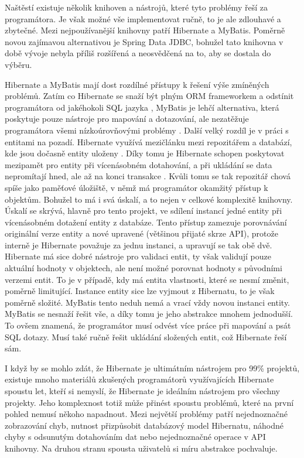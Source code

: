 		Naštěstí existuje několik knihoven a nástrojů, které tyto problémy řeší za programátora.
		Je však možné vše implementovat ručně, to je ale zdlouhavé a zbytečné.
		Mezi nejpoužívanější knihovny patří Hibernate a MyBatis.
		Poměrně novou zajímavou alternativou je Spring Data JDBC, bohužel tato knihovna v době vývoje nebyla příliš
		rozšířená a neosvědčená na to, aby se dostala do výběru.

		Hibernate a MyBatis mají dost rozdílné přístupy k řešení výše zmíněných problémů.
		Zatím co Hibernate se snaží být plným \ac{ORM} frameworkem a odstínit programátora od jakéhokoli
		\ac{SQL} jazyka \cite{hibernate_docs}, MyBatis je lehčí alternativa, která poskytuje pouze nástroje pro mapování a dotazování, ale
		nezatěžuje programátora všemi nízkoúrovňovými problémy \cite{mybatis_getting_started}.
		Další velký rozdíl je v práci s entitami na pozadí.
		Hibernate využívá mezičlánku mezi repozitářem a databází, kde jsou dočasně entity uloženy \cite{hibernate_docs}.
		Díky tomu je Hibernate schopen poskytovat mezipamět pro entity při vícenásobném dotahování, a při ukládání
		se data nepromítají hned, ale až na konci transakce \cite{hibernate_docs}.
		Kvůli tomu se tak repozitář chová spíše jako paměťové úložiště, v němž má programátor okamžitý přístup k objektům.
		Bohužel to má i svá úskalí, a to nejen v celkové komplexitě knihovny.
		Úskalí se skrývá, hlavně pro tento projekt, ve sdílení instancí jedné entity při vícenásobném
		dotažení entity z databáze.
		Tento přístup zamezuje porovnávání originální verze entity a nové upravené (většinou přijaté skrze \ac{API}),
		protože interně je Hibernate považuje za jednu instanci, a upravují se tak obě dvě.
		Hibernate má sice dobré nástroje pro validaci entit, ty však validují pouze aktuální hodnoty v objektech, ale
		není možné porovnat hodnoty s původními verzemi entit.
		To je v případě, kdy má entita vlastnosti, které se nesmí změnit, poměrně limitující.
		Instance entity sice lze vyjmout z Hibernatu, to je však poměrně složité.
		MyBatis tento neduh nemá a vrací vždy novou instanci entity.
		MyBatis se nesnaží řešit vše, a díky tomu je jeho abstrakce mnohem jednodušší.
		To ovšem znamená, že programátor musí odvést více práce při mapování a psát \ac{SQL} dotazy.
		Musí také ručně řešit ukládání složených entit, což Hibernate řeší sám.

		I když by se mohlo zdát, že Hibernate je ultimátním nástrojem pro 99\% projektů, existuje mnoho materiálů
		zkušených programátorů využívajících Hibernate spoustu let, kteří si nemyslí, že Hibernate je ideálním nástrojem
		pro všechny projekty.
		Jeho komplexnost totiž může přinést spoustu problémů, které na první pohled nemusí někoho napadnout.
		Mezi největší problémy patří nejednoznačné zobrazování chyb, nutnost přizpůsobit databázový model Hibernatu,
		náhodné chyby s odsunutým dotahováním dat nebo nejednoznačné operace
		v \ac{API} knihovny.
		Na druhou stranu spousta uživatelů si míru abstrakce pochvaluje. \cite{bad_hibernate}

